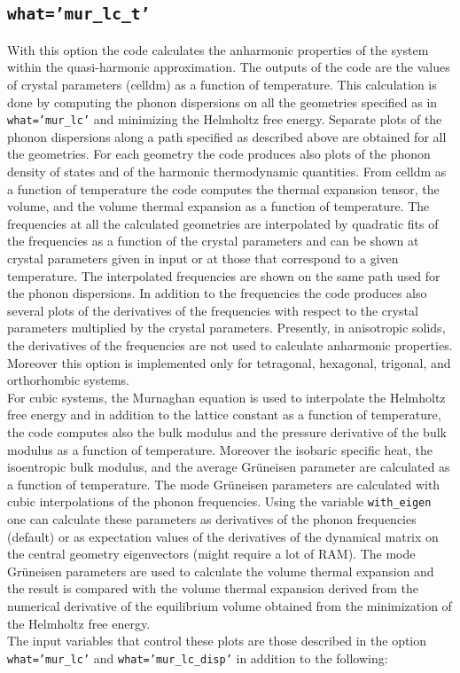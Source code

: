 \documentclass[12pt,a4paper]{article}
\begin{document}
\subsection{\texttt{what='mur\_lc\_t'}}
With this option the code calculates the anharmonic 
properties of the system within the quasi-harmonic approximation. 
The outputs of the code are the values of crystal parameters (celldm) as a 
function of
temperature. This calculation is done by computing the
phonon dispersions on all the geometries specified as in
\texttt{what='mur\_lc'} and minimizing the Helmholtz free energy.
Separate plots of the phonon dispersions along a path specified as
described above are obtained for all the geometries.
For each geometry the code produces also plots of the phonon density
of states and of the harmonic thermodynamic quantities.
From celldm as a function of temperature the code computes the thermal
expansion tensor, the volume, and the volume thermal expansion as a 
function of temperature. 
The frequencies at all the calculated geometries are interpolated
by quadratic fits of the frequencies as a function of the crystal parameters
and can be shown at crystal parameters given in input or at those that
correspond to a given temperature. The interpolated frequencies  
are shown on the same path used for the phonon dispersions.
In addition to the frequencies the code produces also several plots of
the derivatives of the frequencies with respect to the crystal parameters
multiplied by the crystal parameters. 
Presently, in anisotropic solids, the derivatives of the frequencies are 
not used to calculate anharmonic properties. Moreover
this option is implemented only for tetragonal, hexagonal, trigonal, and 
orthorhombic systems. \\
For cubic systems, the Murnaghan equation is used to interpolate the
Helmholtz free energy and in addition to the lattice constant as a function of
temperature, the code computes also the bulk modulus and the
pressure derivative of the bulk modulus as a function 
of temperature. Moreover the isobaric specific heat, the isoentropic 
bulk modulus, and the average Gr\"uneisen parameter are calculated as 
a function of temperature.
The mode Gr\"uneisen parameters are calculated with cubic interpolations of the
phonon frequencies. Using the variable \texttt{with\_eigen} one can 
calculate these parameters as derivatives of the phonon frequencies 
(default) or as expectation values of the derivatives of the dynamical 
matrix on the central geometry eigenvectors (might require a lot of RAM). 
The mode Gr\"uneisen parameters are used to calculate the volume
thermal expansion and the result is compared with the volume thermal expansion
derived from the numerical derivative of the equilibrium volume obtained
from the minimization of the Helmholtz free energy. \\
The input variables that control these plots are those described in the option
\texttt{what='mur\_lc'} and \texttt{what='mur\_lc\_disp'} in addition to the 
following:
\end{document}
